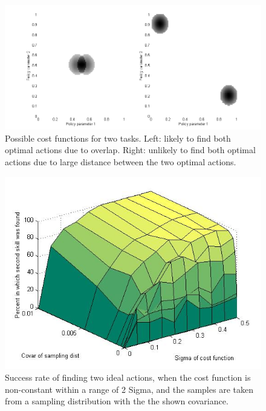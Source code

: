 \documentclass[12pt]{article}
\begin{document}
\begin{figure}[ht]
  \centering
  \includegraphics[width=0.9\columnwidth]{cost_function.png}
  \caption{ Possible cost functions for two tasks. Left: likely to find both optimal actions due to overlap. Right: unlikely to find both optimal actions due to large distance between the two optimal actions.}
  \label{fig:costfunction}
\end{figure}

\begin{figure}[ht]
  \centering
  \includegraphics[width=0.9\columnwidth]{sigma_vs_covar.png}
  \caption{\label{fig_sigma_vs_covar} Success rate of finding two ideal actions, when the cost function is non-constant within a range of 2 Sigma, and the samples are taken from a sampling distribution with the the shown covariance. }
  \label{fig:sigmavscovar}
\end{figure}
\end{document}
